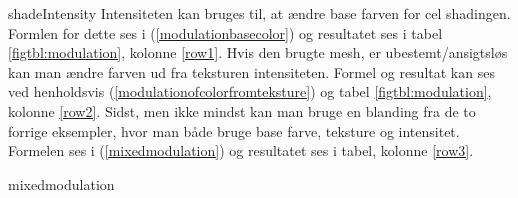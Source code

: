  {shadeIntensity} 
Intensiteten kan bruges til, at ændre base farven for cel shadingen. Formlen for dette ses i
(\ref{modulationbasecolor}) og resultatet ses i tabel \ref{figtbl:modulation}, kolonne \ref{row1}. 
Hvis den brugte mesh, er ubestemt/ansigtsløs kan man ændre farven ud fra teksturen
intensiteten. 
Formel og resultat kan ses ved henholdsvis
(\ref{modulationofcolorfromteksture}) og tabel \ref{figtbl:modulation}, kolonne \ref{row2}. Sidst,
men ikke mindst kan man bruge en blanding fra de to forrige eksempler, hvor man både bruge base
farve, teksture og intensitet. Formelen ses i (\ref{mixedmodulation}) og resultatet ses i tabel, kolonne \ref{row3}.

 {mixedmodulation}

